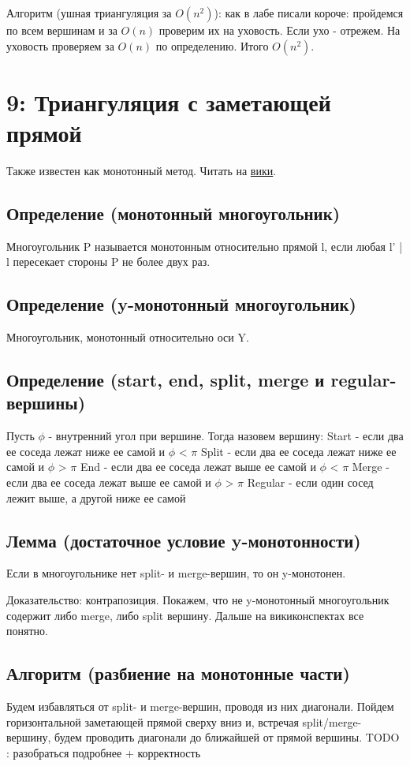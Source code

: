 \documentclass[11pt]{article}
\begin{document}
Алгоритм (ушная триангуляция за $O(n^2)$): как в лабе писали
короче: пройдемся по всем вершинам и за $O(n)$ проверим их на
уховость. Если ухо - отрежем.  На уховость проверяем за $O(n)$ по
определению. Итого $O(n^2)$.
\section{{\bfseries{}} 9:  Триангуляция с заметающей прямой}
\label{sec-11}
Также известен как монотонный метод. Читать на \href{http://neerc.ifmo.ru/wiki/index.php?title=Триангуляция_полигонов_(ушная_\%2B_монотонная)#.D0.9C.D0.BE.D0.BD.D0.BE.D1.82.D0.BE.D0.BD.D0.BD.D1.8B.D0.B9_.D0.BC.D0.B5.D1.82.D0.BE.D0.B4}{вики}.

\subsection{Определение (монотонный многоугольник)}
\label{sec-11-1}
Многоугольник P называется монотонным относительно прямой l, если любая l' \uline{|} l пересекает стороны P
не более двух раз.
\subsection{Определение (y-монотонный многоугольник)}
\label{sec-11-2}
Многоугольник, монотонный относительно оси Y.
\subsection{Определение (start, end, split, merge и regular-вершины)}
\label{sec-11-3}
Пусть $\phi$ - внутренний угол при вершине. Тогда назовем вершину:
Start - если два ее соседа лежат ниже ее самой и $\phi$ < $\pi$
Split - если два ее соседа лежат ниже ее самой и $\phi$ > $\pi$
End - если два ее соседа лежат выше ее самой и $\phi$ < $\pi$
Merge - если два ее соседа лежат выше ее самой и $\phi$ > $\pi$
Regular - если один сосед лежит выше, а другой ниже ее самой
\subsection{Лемма (достаточное условие y-монотонности)}
\label{sec-11-4}
Если в многоугольнике нет split- и merge-вершин, то он y-монотонен.

Доказательство: контрапозиция. Покажем, что не y-монотонный многоугольник содержит либо merge, либо split вершину.
Дальше на викиконспектах все понятно.
\subsection{Алгоритм (разбиение на монотонные части)}
\label{sec-11-5}
Будем избавляться от split- и merge-вершин, проводя из них диагонали.
Пойдем горизонтальной заметающей прямой сверху вниз и, встречая split/merge-вершину, будем проводить диагонали до ближайшей от прямой вершины.
TODO : разобраться подробнее + корректность
\end{document}
